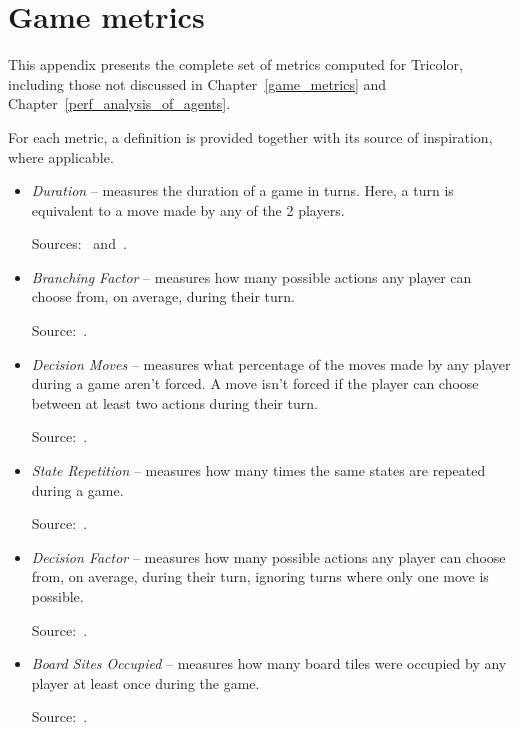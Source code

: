\chapter{Game metrics}
\label{all_game_metrics}

This appendix presents the complete set of metrics computed for Tricolor, including those not discussed in Chapter~\ref{game_metrics} and Chapter~\ref{perf_analysis_of_agents}.

For each metric, a definition is provided together with its source of inspiration, where applicable.

\begin{itemize}
    \item \textit{Duration} -- measures the duration of a game in turns. Here, a turn is equivalent to a move made by any of the 2 players.
    
    Sources:~\cite{browne2010evolutionary} and~\cite{shannon1950chess2}.
    
    \item \textit{Branching Factor} -- measures how many possible actions any player can choose from, on average, during their turn.
    
    Source:~\cite{shannon1950chess2}.
    
    \item \textit{Decision Moves} -- measures what percentage of the moves made by any player during a game aren’t forced. A move isn’t forced if the player can choose between at least two actions during their turn.
    
    Source:~\cite{ludii_concepts}.
    
    \item \textit{State Repetition} -- measures how many times the same states are repeated during a game.
    
    Source:~\cite{ludii_concepts}.
    
    \item \textit{Decision Factor} -- measures how many possible actions any player can choose from, on average, during their turn, ignoring turns where only one move is possible.
    
    Source:~\cite{ludii_concepts}.
    
    \item \textit{Board Sites Occupied} -- measures how many board tiles were occupied by any player at least once during the game.
    
    Source:~\cite{ludii_concepts}.
    

\end{itemize}
